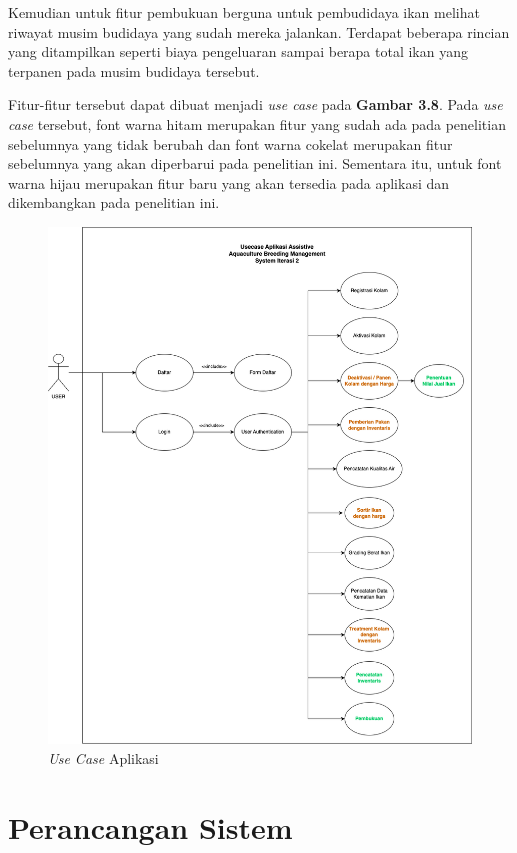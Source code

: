 \begin{spacing}{1.5}
Kemudian untuk fitur pembukuan berguna untuk pembudidaya ikan melihat riwayat musim budidaya yang sudah mereka jalankan. Terdapat beberapa rincian yang ditampilkan seperti biaya pengeluaran sampai berapa total ikan yang terpanen pada musim budidaya tersebut.

Fitur-fitur tersebut dapat dibuat menjadi \textit{use case} pada \textbf{Gambar 3.8}. Pada \textit{use case} tersebut, font warna hitam merupakan fitur yang sudah ada pada penelitian sebelumnya yang tidak berubah dan font warna cokelat merupakan fitur sebelumnya yang akan diperbarui pada penelitian ini. Sementara itu, untuk font warna hijau merupakan fitur baru yang akan tersedia pada aplikasi dan dikembangkan pada penelitian ini.

\begin{figure}[H]
	\centering
	\includegraphics[width=1\textwidth]{gambar/usecase_iterasi_2.png}
	\caption{\textit{Use Case} Aplikasi}
\end{figure}

\section{Perancangan Sistem}


\end{spacing}
